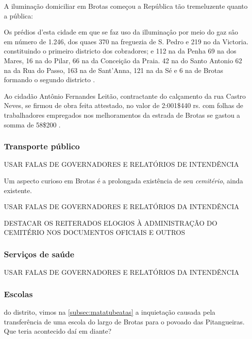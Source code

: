 A iluminação domiciliar em Brotas começou a República tão tremeluzente quanto a pública:

\begin{citacao}
Os prédios d'esta cidade em que se faz uso da illuminaçâo por meio do gaz sâo em número de 1.246, dos quaes 370 na freguezia de S. Pedro e 219 no da Victoria. constituindo o primeiro districto dos cobradores; e 112 na da Penha 69 na dos Mares, 16 na do Pilar, 66 na da Conceição da Praia. 42 na do Santo Antonio 62 na da Rua do Passo, 163 na de Sant'Anna, 121 na da Sé e 6 na de Brotas formando o segundo districto \cite[p.~151]{salvador_relatorio_1896}. 
\end{citacao}

\begin{citacao}
Ao cidadão Antônio Fernandes Leitão, contractante do calçamento da rua Castro Neves, se firmou de obra feita attestado, no valor de 2:001\$440 rs. com folhas de trabalhadores empregados nos melhoramentos da estrada de Brotas se gastou a somma de 58\$200 \cite[p.~]{salvador_relatorio_1896}.
\end{citacao}



\subsubsection{Transporte público}

USAR FALAS DE GOVERNADORES E RELATÓRIOS DE INTENDÊNCIA

Um aspecto curioso em Brotas é a prolongada existência de seu \textit{cemitério}, ainda existente.

USAR FALAS DE GOVERNADORES E RELATÓRIOS DA INTENDÊNCIA

DESTACAR OS REITERADOS ELOGIOS À ADMINISTRAÇÃO DO CEMITÉRIO NOS DOCUMENTOS OFICIAIS E OUTROS

\subsubsection{Serviços de saúde}

USAR FALAS DE GOVERNADORES E RELATÓRIOS DA INTENDÊNCIA

\subsubsection{Escolas} 

do distrito, vimos na \autoref{subsec:matatubeatas} a inquietação causada pela transferência de uma escola do largo de Brotas para o povoado das Pitangueiras. Que teria acontecido daí em diante?



